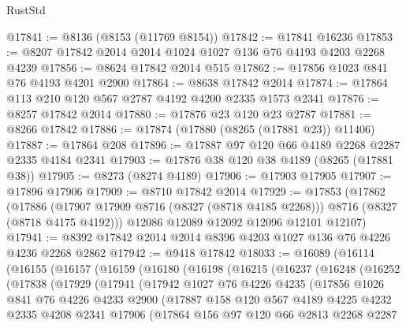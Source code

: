\begin{lexlean}{RustStd}
\begin{coremodule}
{\begin{coremodule}
{{{{{{{{{{{{{{{{{{{{{{{{{{{{{{{{{{{{{{{{{{{{{{{{{{{{{{@17841 := @8136 (@8153 (@11769 @8154))
@17842 := @17841 @16236
@17853 := @8207 @17842 @2014 @2014 @1024 @1027 @136 @76 @4193 @4203 @2268 @4239
@17856 := @8624 @17842 @2014 @515
@17862 := @17856 @1023 @841 @76 @4193 @4201 @2900
@17864 := @8638 @17842 @2014
@17874 := @17864 @113 @210 @120 @567 @2787 @4192 @4200 @2335 @1573 @2341
@17876 := @8257 @17842 @2014
@17880 := @17876 @23 @120 @23 @2787
@17881 := @8266 @17842
@17886 := @17874 (@17880 (@8265 (@17881 @23)) @11406)
@17887 := @17864 @208
@17896 := @17887 @97 @120 @66 @4189 @2268 @2287 @2335 @4184 @2341
@17903 := @17876 @38 @120 @38 @4189 (@8265 (@17881 @38))
@17905 := @8273 (@8274 @4189)
@17906 := @17903 @17905
@17907 := @17896 @17906
@17909 := @8710 @17842 @2014
@17929 := @17853
    (@17862
      (@17886 (@17907 @17909 @8716 (@8327 (@8718 @4185 @2268))) @8716 (@8327 (@8718 @4175 @4192)))
      @12086
      @12089
      @12092
      @12096
      @12101
      @12107)
@17941 := @8392 @17842 @2014 @2014 @8396 @4203 @1027 @136 @76 @4226 @4236 @2268 @2862
@17942 := @9418 @17842
@18033 := @16089
    (@16114
      (@16155
        (@16157
          (@16159
            (@16180
              (@16198
                (@16215
                  (@16237
                    (@16248
                      (@16252
                        (@17838
                          (@17929
                            (@17941
                              (@17942
                                @1027
                                @76
                                @4226
                                @4235
                                (@17856
                                  @1026
                                  @841
                                  @76
                                  @4226
                                  @4233
                                  @2900
                                  (@17887
                                    @158
                                    @120
                                    @567
                                    @4189
                                    @4225
                                    @4232
                                    @2335
                                    @4208
                                    @2341
                                    @17906
                                    (@17864
                                      @156
                                      @97
                                      @120
                                      @66
                                      @2813
                                      @2268
                                      @2287
}}}}}}}}}}}}}}}}}}}}}}}}}}}}}}}}}}}}}}}}}}}}}}}}}}}}}}
\end{coremodule}}
\end{coremodule}
\end{lexlean}
